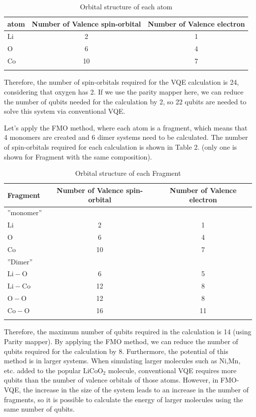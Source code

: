\documentclass[pdflatex,sn-mathphys-num]{sn-jnl}%
\theoremstyle{thmstyleone}%
\theoremstyle{thmstyletwo}%
\theoremstyle{thmstylethree}%
\begin{document}
\begin{table}[h]
\caption{Orbital structure of each atom}\label{tab1}%
\begin{tabular}{@{}lcc@{}}
\toprule
atom & Number of Valence spin-orbital  & Number of Valence electron\\
\midrule
\(\mathrm{Li}\)   & 2   & 1   \\ 
\(\mathrm{O}\)   & 6   & 4  \\
\(\mathrm{Co}\)   & 10   & 7   \\
\botrule
\end{tabular}
\end{table}
Therefore, the number of spin-orbitals required for the VQE calculation is 24, considering that oxygen has 2. 
If we use the parity mapper here, we can reduce the number of qubits needed for the calculation by 2,
so 22 qubits are needed to solve this system via conventional VQE. 

Let's apply the FMO method, where each atom is a fragment, which means that 4 monomers are created and 6 dimer systems need to be calculated. 
The number of spin-orbitals required for each calculation is shown in Table 2. (only one is shown for Fragment with the same composition).
\begin{table}[h]
\caption{Orbital structure of each Fragment}\label{tab2}%
\begin{tabular}{@{}lcc@{}}
\toprule
Fragment & Number of Valence spin-orbital  & Number of Valence electron\\
\midrule
''monomer''   &   &  \\
\(\mathrm{Li}\)   & 2   & 1   \\
\(\mathrm{O}\)   & 6   & 4  \\
\(\mathrm{Co}\)   & 10   & 7   \\
''Dimer''   &   &  \\
\(\mathrm{Li-O}\)   & 6   & 5   \\
\(\mathrm{Li-Co}\)   & 12   & 8  \\
\(\mathrm{O-O}\)   & 12   & 8   \\
\(\mathrm{Co-O}\)   & 16   & 11   \\
\botrule
\end{tabular}
\end{table}

Therefore, the maximum number of qubits required in the calculation is 14 (using Parity mapper). 
By applying the FMO method, we can reduce the number of qubits required for the calculation by 8. 
Furthermore, the potential of this method is in larger systems. 
When simulating larger molecules such as \(\mathrm{Ni}\),\(\mathrm{Mn}\), etc. 
added to the popular \(\mathrm{LiCoO_2}\) molecule, conventional VQE requires more qubits than the number of valence orbitals of those atoms.
However, in FMO-VQE, the increase in the size of the system leads to an increase in the number of fragments, 
so it is possible to calculate the energy of larger molecules using the same number of qubits.
\end{document}
